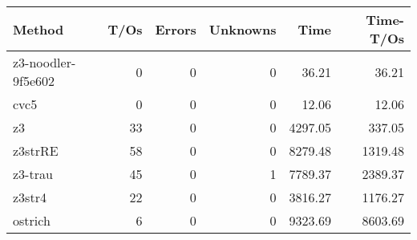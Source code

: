 \begin{tabular}{lrrrrr}
\hline
 Method             &   T/Os &   Errors &   Unknowns &    Time &   Time-T/Os \\
\hline
 z3-noodler-9f5e602 &      0 &        0 &          0 &   36.21 &       36.21 \\
 cvc5               &      0 &        0 &          0 &   12.06 &       12.06 \\
 z3                 &     33 &        0 &          0 & 4297.05 &      337.05 \\
 z3strRE            &     58 &        0 &          0 & 8279.48 &     1319.48 \\
 z3-trau            &     45 &        0 &          1 & 7789.37 &     2389.37 \\
 z3str4             &     22 &        0 &          0 & 3816.27 &     1176.27 \\
 ostrich            &      6 &        0 &          0 & 9323.69 &     8603.69 \\
\hline
\end{tabular}
